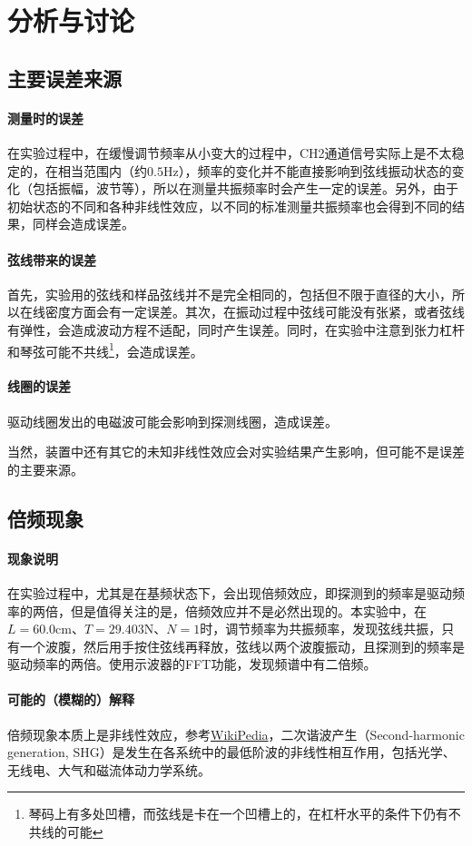 \documentclass{ctexart}
\begin{document}
	\section{分析与讨论}
	\subsection{主要误差来源}
	\paragraph{测量时的误差}
	在实验过程中，在缓慢调节频率从小变大的过程中，CH2通道信号实际上是不太稳定的，在相当范围内（约$0.5\mathrm{Hz}$），频率的变化并不能直接影响到弦线振动状态的变化（包括振幅，波节等），所以在测量共振频率时会产生一定的误差。另外，由于初始状态的不同和各种非线性效应，以不同的标准测量共振频率也会得到不同的结果，同样会造成误差。
	\paragraph{弦线带来的误差}
	首先，实验用的弦线和样品弦线并不是完全相同的，包括但不限于直径的大小，所以在线密度方面会有一定误差。其次，在振动过程中弦线可能没有张紧，或者弦线有弹性，会造成波动方程不适配，同时产生误差。同时，在实验中注意到张力杠杆和琴弦可能不共线\footnote{琴码上有多处凹槽，而弦线是卡在一个凹槽上的，在杠杆水平的条件下仍有不共线的可能}，会造成误差。
	\paragraph{线圈的误差}
	驱动线圈发出的电磁波可能会影响到探测线圈，造成误差。
	
	当然，装置中还有其它的未知非线性效应会对实验结果产生影响，但可能不是误差的主要来源。
	\subsection{倍频现象}
	\paragraph{现象说明}
	在实验过程中，尤其是在基频状态下，会出现倍频效应，即探测到的频率是驱动频率的两倍，但是值得关注的是，倍频效应并不是必然出现的。本实验中，在$L=60.0\mathrm{cm}$、$T=29.403\mathrm{N}$、$N=1$时，调节频率为共振频率，发现弦线共振，只有一个波腹，然后用手按住弦线再释放，弦线以两个波腹振动，且探测到的频率是驱动频率的两倍。使用示波器的FFT功能，发现频谱中有二倍频。
	\paragraph{可能的（模糊的）解释}
	倍频现象本质上是非线性效应，参考\href{https://en.wikipedia.org/wiki/Second-harmonic_generation}{WikiPedia}，二次谐波产生（Second-harmonic generation, SHG）是发生在各系统中的最低阶波的非线性相互作用，包括光学、无线电、大气和磁流体动力学系统。
	
\end{document}
